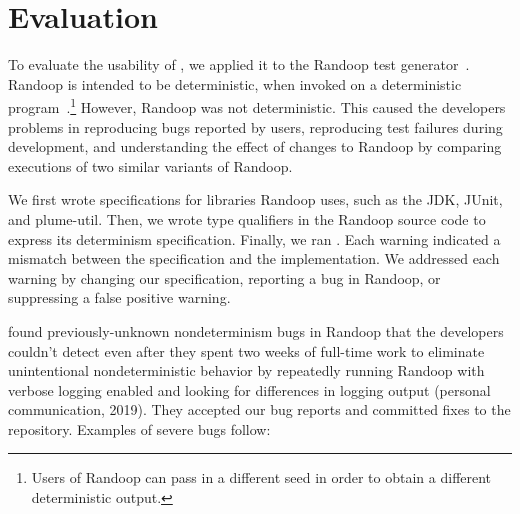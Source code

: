 \section{Evaluation\label{sec:results}}
To evaluate the usability of \theDeterminismChecker,
we applied it to the Randoop test
generator~\cite{PachecoLEB2007}.
Randoop is intended to be deterministic, when invoked on a deterministic
program~\cite{randoop-manual}.\footnote{Users of Randoop can pass in a different seed in order to
    obtain a different deterministic output.  
}
However, Randoop was not deterministic.  This caused the developers
problems in 
reproducing bugs reported by users, 
reproducing test failures during development, and
understanding the effect of changes to Randoop by comparing executions of two
similar variants of Randoop.

We first wrote specifications for libraries Randoop uses, such as the JDK,
JUnit, and plume-util.
Then, we wrote type qualifiers in the Randoop source code to express its
determinism specification.
Finally, we ran
\theDeterminismChecker.  Each warning indicated a mismatch between the
specification and the implementation.  We addressed each warning by changing our
specification, reporting a bug in Randoop, or suppressing a false positive warning.

\TheDeterminismChecker found \numRandoopBugs previously-unknown nondeterminism bugs in Randoop that the developers couldn't detect even after they
spent two weeks of full-time work to
eliminate unintentional nondeterministic behavior by repeatedly
running Randoop with verbose logging enabled and
looking for differences in logging output (personal communication, 2019).
They accepted our bug reports and committed fixes to the repository. Examples
of severe bugs follow:

